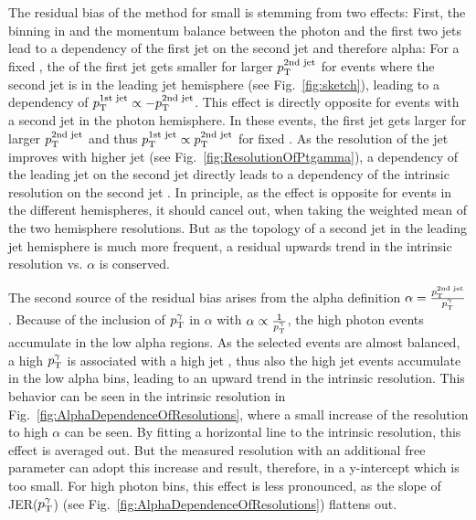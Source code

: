 The residual bias of the method for small \ptgamma is stemming from two effects: 
First, the binning in \ptgamma and the momentum balance between the photon and the first two jets lead to a dependency of the first jet \pt on the second jet \pt and therefore alpha: 
For a fixed \ptgamma, 
the \pt of the first jet gets smaller for larger $p_{\text{T}}^{\text{2nd jet}}$ for events where the second jet is in the leading jet hemisphere (see Fig.~\ref{fig:sketch}), leading to a dependency of $p_{\text{T}}^{\text{1st jet}} \propto -p_{\text{T}}^{\text{2nd jet}}$.
This effect is directly opposite for events with a second jet in the photon hemisphere. 
In these events, the first jet \pt gets larger for larger $p_{\text{T}}^{\text{2nd jet}}$ and thus $p_{\text{T}}^{\text{1st jet}} \propto p_{\text{T}}^{\text{2nd jet}}$ for fixed \ptgamma. 
As the resolution of the jet improves with higher jet \pt (see Fig.~\ref{fig:ResolutionOfPtgamma}), 
a dependency of the leading jet \pt on the second jet \pt directly leads to a dependency of the intrinsic resolution on the second jet \pt. 
In principle, as the effect is opposite for events in the different hemispheres, it should cancel out, when taking the weighted mean of the two hemisphere resolutions. 
But as the topology of a second jet in the leading jet hemisphere is much more frequent, a residual upwards trend in the intrinsic resolution vs. $\alpha$ is conserved. 

The second source of the residual bias arises from the alpha definition $\alpha = \frac{p_{\text{T}}^{\text{2nd jet}}}{p_{\text{T}}^{\gamma}}$. 
Because of the inclusion of $p_{\text{T}}^{\gamma}$ in $\alpha$ with $\alpha \propto \frac{1}{p_{\text{T}}^{\gamma}}$, 
the high photon \pt events accumulate in the low alpha regions. 
As the selected events are almost balanced, a high $p_{\text{T}}^{\gamma}$ is associated with a high jet \pt, thus also the high jet \pt events accumulate in the low alpha bins, 
leading to  an upward trend in the intrinsic resolution. This behavior can be seen in the intrinsic resolution 
in Fig.~\ref{fig:AlphaDependenceOfResolutions}, where a small increase of the resolution to high $\alpha$ can be seen. 
By fitting a horizontal line to the intrinsic resolution, this effect is averaged out. 
But the measured resolution with an additional free parameter 
can adopt this increase and result, therefore, in a y-intercept which is too small. 
For high photon \pt bins, this effect is less pronounced, as the slope of JER($p_{\text{T}}^{\gamma}$) (see Fig.~\ref{fig:AlphaDependenceOfResolutions}) flattens out.

